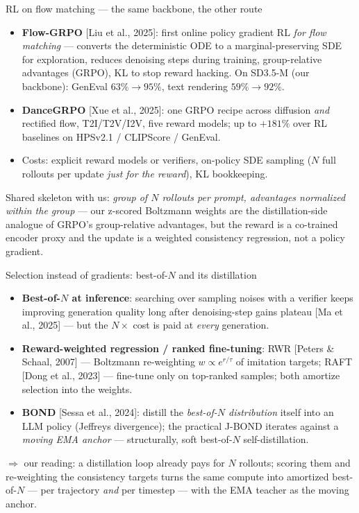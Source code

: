\documentclass[aspectratio=169,10pt]{beamer}
\newcommand{\litref}[1]{{\scriptsize\color{black!55}[#1]}}
\newcommand{\takeaway}[1]{\vspace{0.25em}$\Rightarrow$ \alert{#1}}
\begin{document}
\begin{frame}{RL on flow matching --- the same backbone, the other route}
  \begin{itemize}
    \item \textbf{Flow-GRPO} \litref{Liu et al., 2025}: first online policy
      gradient RL \emph{for flow matching} --- converts the deterministic ODE
      to a marginal-preserving SDE for exploration, reduces denoising steps
      during training, group-relative advantages (GRPO), KL to stop reward
      hacking. On \alert{SD3.5-M (our backbone)}: GenEval $63\% \to 95\%$,
      text rendering $59\% \to 92\%$.
    \item \textbf{DanceGRPO} \litref{Xue et al., 2025}: one GRPO recipe across
      diffusion \emph{and} rectified flow, T2I/T2V/I2V, five reward models;
      up to $+181\%$ over RL baselines on HPSv2.1 / CLIPScore / GenEval.
    \item Costs: explicit reward models or verifiers, on-policy SDE sampling
      ($N$ full rollouts per update \emph{just for the reward}), KL
      bookkeeping.
  \end{itemize}
  \vspace{0.4em}
  Shared skeleton with us: \emph{group of $N$ rollouts per prompt, advantages
  normalized within the group} --- our z-scored Boltzmann weights are the
  distillation-side analogue of GRPO's group-relative advantages, but the
  reward is a co-trained encoder proxy and the update is a weighted
  consistency regression, not a policy gradient.
\end{frame}

\begin{frame}{Selection instead of gradients: best-of-$N$ and its distillation}
  \begin{itemize}
    \item \textbf{Best-of-$N$ at inference}: searching over sampling noises
      with a verifier keeps improving generation quality long after
      denoising-step gains plateau \litref{Ma et al., 2025} --- but the
      $N\times$ cost is paid at \emph{every} generation.
    \item \textbf{Reward-weighted regression / ranked fine-tuning}: RWR
      \litref{Peters \& Schaal, 2007} --- Boltzmann re-weighting
      $w \propto e^{r/\tau}$ of imitation targets; RAFT
      \litref{Dong et al., 2023} --- fine-tune only on top-ranked samples;
      both amortize selection into the weights.
    \item \textbf{BOND} \litref{Sessa et al., 2024}: distill the
      \emph{best-of-$N$ distribution} itself into an LLM policy (Jeffreys
      divergence); the practical J-BOND iterates against a
      \emph{moving EMA anchor} --- structurally, soft best-of-$N$
      self-distillation.
  \end{itemize}
  \takeaway{our reading: a distillation loop already pays for $N$ rollouts;
  scoring them and re-weighting the consistency targets turns the same compute
  into amortized best-of-$N$ --- per trajectory \emph{and} per timestep ---
  with the EMA teacher as the moving anchor.}
\end{frame}
\end{document}

